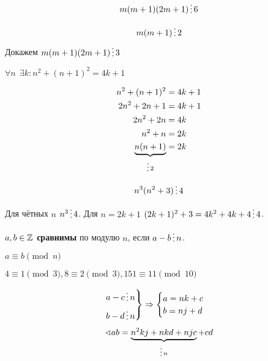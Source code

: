 \begin{exercise*}
    \[m(m + 1)(2m + 1) \divided 6\]
\end{exercise*}
\begin{solution}
    \[m(m + 1) \divided 2\]
    Докажем \(m(m + 1)(2m + 1) \divided 3\)
    \begin{caseof}
    \end{caseof}
\end{solution}

\begin{exercise*}
    \(\forall n \ \ \exists k : n^2 + (n + 1)^2 = 4k + 1\)
\end{exercise*}
\begin{solution}
    \begin{align*}
        n^2 + (n + 1)^2                    & = 4k + 1 \\
        2n^2 + 2n + 1                      & = 4k + 1 \\
        2n^2 + 2n                          & = 4k     \\
        n^2 + n                            & = 2k     \\
        \underbrace{n(n + 1)}_{\divided 2} & = 2k     \\
    \end{align*}
\end{solution}

\begin{exercise*}
    \[n^3(n^2 + 3) \divided 4\]
\end{exercise*}
\begin{solution}
    Для чётных \(n\) \(n^3 \divided 4\). Для \(n = 2k + 1\) \((2k + 1)^2 + 3 = 4k^2 + 4k + 4 \divided 4\).
\end{solution}

\begin{definition}
    \(a, b \in \mathbb{Z}\) \textbf{сравнимы} по модулю \(n\), если \(a - b \divided n\).
\end{definition}
\begin{notation}
    \(a \equiv b \pmod n\)
\end{notation}
\begin{example}
    \(4 \equiv 1 \pmod 3, 8 \equiv 2 \pmod 3, 151 \equiv 11 \pmod{10}\)
\end{example}

\[\begin{rcases}
        a - c \divided n \\
        b - d \divided n
    \end{rcases} \Rightarrow \begin{cases}
        a = nk + c \\
        b = nj + d
    \end{cases}\]
\[\sphericalangle ab = \underbrace{n^2 kj + nkd + njc}_{\divided n} + cd\]

